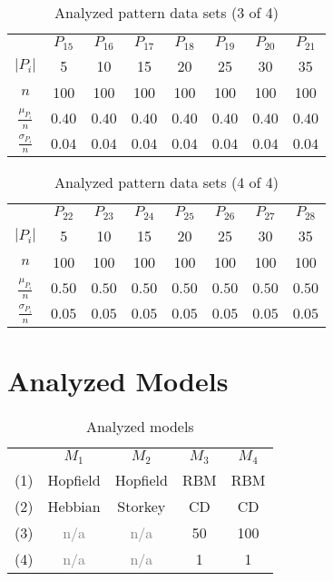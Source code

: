\documentclass[anon]{CI}
\begin{document}
\begin{table}[H]
	\centering
	\def\arraystretch{1.5}
	\begin{tabular}{cccccccc}
		
		& $P_{15}$  & $P_{16}$  & $P_{17}$  & $P_{18}$  & $P_{19}$  & $P_{20}$  & $P_{21}$  \\ \cline{2-8}
		$\left|P_i\right|$  & 5  & 10  & 15  & 20  & 25  & 30  & 35 \\
		$n$  & 100  & 100  & 100  & 100  & 100  & 100  & 100 \\
		$\frac{\mu_{P_i}}{n}$  & $0.40$  & $0.40$  & $0.40$  & $0.40$  & $0.40$  & $0.40$  & $0.40$ \\
		$\frac{\sigma_{P_i}}{n}$  & $0.04$  & $0.04$  & $0.04$  & $0.04$  & $0.04$  & $0.04$  & $0.04$ 
	\end{tabular}
	\caption{Analyzed pattern data sets (3 of 4)}
\end{table}


\begin{table}[H]
	\centering
	\def\arraystretch{1.5}
	\begin{tabular}{cccccccc}
		
		& $P_{22}$  & $P_{23}$  & $P_{24}$  & $P_{25}$  & $P_{26}$  & $P_{27}$  & $P_{28}$  \\ \cline{2-8}
		$\left|P_i\right|$  & 5  & 10  & 15  & 20  & 25  & 30  & 35 \\
		$n$  & 100  & 100  & 100  & 100  & 100  & 100  & 100 \\
		$\frac{\mu_{P_i}}{n}$  & $0.50$  & $0.50$  & $0.50$  & $0.50$  & $0.50$  & $0.50$  & $0.50$ \\
		$\frac{\sigma_{P_i}}{n}$  & $0.05$  & $0.05$  & $0.05$  & $0.05$  & $0.05$  & $0.05$  & $0.05$ 
	\end{tabular}
	\caption{Analyzed pattern data sets (4 of 4)}
\end{table}

\section{Analyzed Models}\label{AppB}



\begin{table}[H]
	\centering
	\def\arraystretch{1.5}
	\begin{tabular}{ccccc}
		
		& $M_{1}$  & $M_{2}$  & $M_{3}$  & $M_{4}$  \\ \cline{2-5}
		(1)  & Hopfield  & Hopfield  & RBM  & RBM \\
		(2)  & Hebbian  & Storkey  & CD  & CD \\
		(3)  & \textcolor{gray}{n/a}  & \textcolor{gray}{n/a}  & 50  & 100 \\
		(4)  & \textcolor{gray}{n/a}  & \textcolor{gray}{n/a}  & 1  & 1 
	\end{tabular}
	\caption{Analyzed models}
\end{table}
\end{document}
